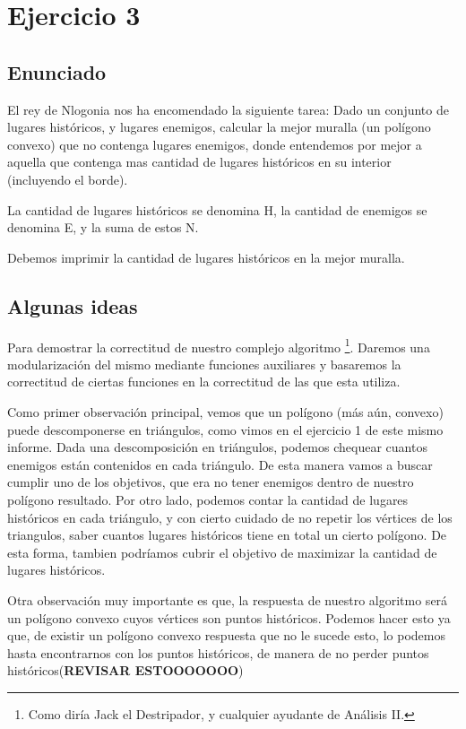 \section{Ejercicio 3}

\subsection{Enunciado}

El rey de Nlogonia nos ha encomendado la siguiente tarea: Dado un conjunto de lugares históricos, y lugares enemigos, calcular la mejor muralla (un polígono convexo) que no contenga lugares enemigos, donde entendemos por mejor a aquella que contenga mas cantidad de lugares históricos en su interior (incluyendo el borde).

La cantidad de lugares históricos se denomina H, la cantidad de enemigos se denomina E, y la suma de estos N.

Debemos imprimir la cantidad de lugares históricos en la mejor muralla.

\subsection{Algunas ideas}
\par{Para demostrar la correctitud de nuestro complejo algoritmo \footnote{Como diría Jack el Destripador, y cualquier ayudante de Análisis II.}. Daremos una modularización del mismo mediante funciones auxiliares y basaremos la correctitud de ciertas funciones en la correctitud de las que esta utiliza.} 
\par{Como primer observación principal, vemos que un polígono (más aún, convexo) puede descomponerse en triángulos, como vimos en el ejercicio 1 de este mismo informe. Dada una descomposición en triángulos, podemos chequear cuantos enemigos están contenidos en cada triángulo. De esta manera vamos a buscar cumplir uno de los objetivos, que era no tener enemigos dentro de nuestro polígono resultado. Por otro lado, podemos contar la cantidad de lugares históricos en cada triángulo, y con cierto cuidado de no repetir los vértices de los triangulos, saber cuantos lugares históricos tiene en total un cierto polígono. De esta forma, tambien podríamos cubrir el objetivo de maximizar la cantidad de lugares históricos.}
\par{Otra observación muy importante es que, la respuesta de nuestro algoritmo será un polígono convexo cuyos vértices son puntos históricos. Podemos hacer esto ya que, de existir un polígono convexo respuesta que no le sucede esto, lo podemos  hasta encontrarnos con los puntos históricos, de manera de no perder puntos históricos(\textbf{REVISAR ESTOOOOOOO})}

